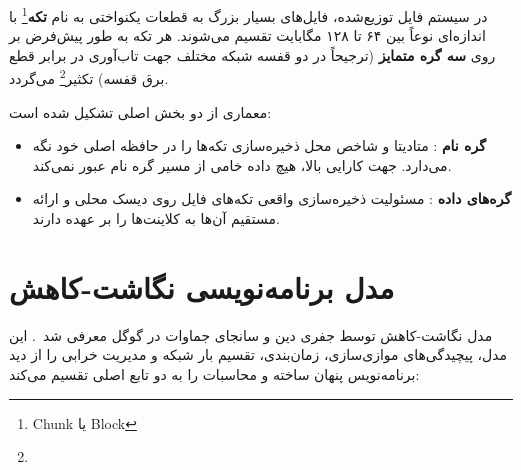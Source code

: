 \begin{definition}
در سیستم فایل توزیع‌شده، فایل‌های بسیار بزرگ به قطعات یکنواختی به نام \textbf{تکه}\footnote{Chunk یا Block} با اندازه‌ای نوعاً بین ۶۴ تا ۱۲۸ مگابایت تقسیم می‌شوند. هر تکه به طور پیش‌فرض بر روی \textbf{سه گره متمایز} (ترجیحاً در دو قفسه شبکه مختلف جهت تاب‌آوری در برابر قطع برق قفسه) تکثیر\footnote{} می‌گردد.
\end{definition}

معماری  از دو بخش اصلی تشکیل شده است:
\begin{itemize}
    \item \textbf{گره نام }: متادیتا و شاخص محل ذخیره‌سازی تکه‌ها را در حافظه اصلی خود نگه می‌دارد. جهت کارایی بالا، هیچ داده خامی از مسیر گره نام عبور نمی‌کند.
    \item \textbf{گره‌های داده }: مسئولیت ذخیره‌سازی واقعی تکه‌های فایل روی دیسک محلی و ارائه مستقیم آن‌ها به کلاینت‌ها را بر عهده دارند.
\end{itemize}

\section{مدل برنامه‌نویسی نگاشت-کاهش \texorpdfstring{}{(MapReduce)}}
مدل نگاشت-کاهش توسط جفری دین و سانجای جماوات در گوگل معرفی شد~\cite{dean2008mapreduce}. این مدل، پیچیدگی‌های موازی‌سازی، زمان‌بندی، تقسیم بار شبکه و مدیریت خرابی را از دید برنامه‌نویس پنهان ساخته و محاسبات را به دو تابع اصلی تقسیم می‌کند:

